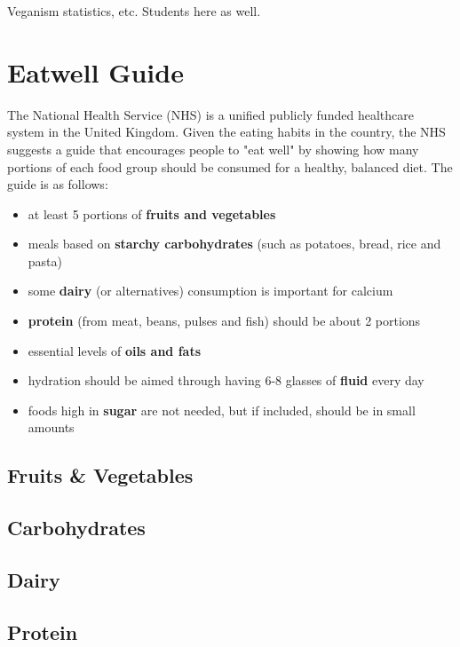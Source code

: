 \documentclass{l4proj}
\begin{document}
Veganism statistics, etc. Students here as well.

\section{Eatwell Guide}

The National Health Service (NHS) is a unified publicly funded healthcare system in the United Kingdom. Given the eating habits in the country, the NHS suggests a guide that encourages people to "eat well" by showing how many portions of each food group should be consumed for a healthy, balanced diet. The guide is as follows:

\begin{itemize}
    \item at least 5 portions of \textbf{fruits and vegetables}
    \item meals based on \textbf{starchy carbohydrates} (such as potatoes, bread, rice and pasta) %
    \item some \textbf{dairy} (or alternatives) consumption is important for calcium %
    \item \textbf{protein} (from meat, beans, pulses and fish) should be about 2 portions %
    \item essential levels of \textbf{oils and fats}
    \item hydration should be aimed through having 6-8 glasses of \textbf{fluid} every day
    \item foods high in \textbf{sugar} are not needed, but if included, should be in small amounts
\end{itemize}

\subsection{Fruits \& Vegetables}

\subsection{Carbohydrates}

\subsection{Dairy}

\subsection{Protein}
\end{document}

